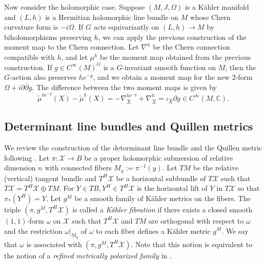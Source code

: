 \documentclass[12pt,reqno,a4paper]{amsart}
\numberwithin{equation}{section}
\theoremstyle{definition}
\theoremstyle{remark}
\begin{document}
Now consider the holomorphic case. Suppose $(M,J,\Omega)$ is a K\"ahler manifold and $(L,h)$ is a Hermitian holomorphic line bundle on $M$ whose Chern curvature form is $-i\Omega$. If $G$ acts equivariantly on $(L,h)\rightarrow M$ by biholomorphisms preserving $h$, we can apply the previous construction of the moment map to the Chern connection. Let $\nabla^h$ be the Chern connection compatible with $h$, and let $\mu^h$ be the moment map obtained from the previous construction. If $g\in C^\infty(M)^G$ is a $G$-invariant smooth function on $M$, then the $G$-action also preserves $he^{-g}$, and we obtain a moment map for the new $2$-form $\Omega+i\partial\bar{\partial}g$. The difference between the two moment maps is given by
\begin{equation}\label{compare}
\widetilde{\mu}^{he^{-g}}(X)-\widetilde{\mu}^h(X)=-\nabla^{he^{-g}}_{\widehat{X}}+\nabla^{h}_{\widehat{X}}=\iota_{\widehat{X}} \partial g\in C^\infty(M,\mathbb{C}).
\end{equation}

\subsection{Determinant line bundles and Quillen metrics}\label{bgs}

We review the construction of the determinant line bundle and the Quillen metric following \cite{bismut1988analytic3}. Let $\pi : \mathcal{X}\rightarrow B$ be a proper holomorphic submersion of relative dimension $n$ with connected fibers $M_y:=\pi^{-1}(y)$. Let $TM$ be the relative (vertical) tangent bundle and $T^H \mathcal{X}$ be a horizontal subbundle of $T\mathcal{X}$ such that $T\mathcal{X}=T^H \mathcal{X} \oplus TM$. For $Y\in TB, Y^H\in T^H \mathcal{X}$ is the horizontal lift of $Y$ in $T\mathcal{X}$ so that $\pi_*(Y^H)=Y$. Let $g^M$ be a smooth family of K\"ahler metrics on the fibers. The triple $(\pi,g^M,T^H\mathcal{X})$ is called a \textit{K\"ahler fibration} if there exists a closed smooth $(1,1)$-form $\omega$ on $\mathcal{X}$ such that $T^H \mathcal{X}$ and $TM$ are orthogonal with respect to $\omega$ and the restriction $\omega|_{M_y}$ of $\omega$ to each fiber defines a K\"ahler metric $g^M$. We say that $\omega$ is associated with $(\pi,g^M,T^H\mathcal{X})$. Note that this notion is equivalent to the notion of a \textit{refined metrically polarized family} in \cite[Remark 3.2]{fujiki1990moduli}.
\end{document}
